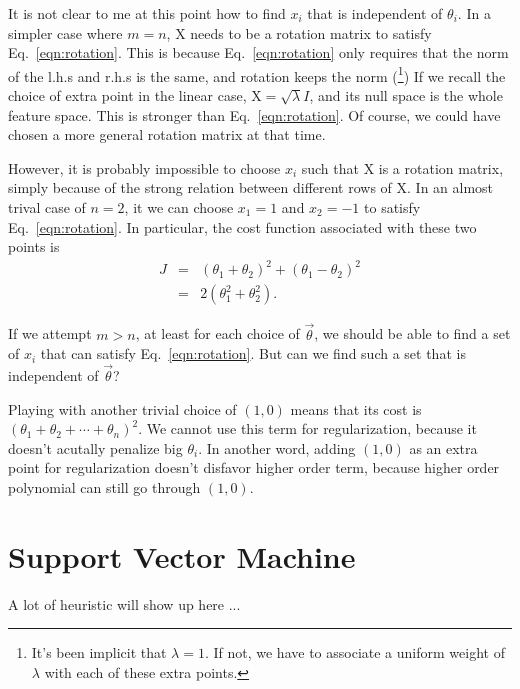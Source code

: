 It is not clear to me at this point how to find $x_i$ that is independent of $\theta_i$. In a simpler case where $m = n$, $\mathrm X$ needs to be a rotation matrix to satisfy Eq.~\ref{eqn:rotation}. This is because Eq.~\ref{eqn:rotation} only requires that the norm of the l.h.s and r.h.s is the same, and rotation keeps the norm (\footnote{It's been implicit that $\lambda=1$. If not, we have to associate a uniform weight of $\lambda$ with each of these extra points.}) If we recall the choice of extra point in the linear case, $\mathrm X=\sqrt{\lambda}I$, and its null space is the whole feature space. This is stronger than Eq.~\ref{eqn:rotation}. Of course, we could have chosen a more general rotation matrix at that time.

However, it is probably impossible to choose $x_i$ such that $\mathrm X$ is a rotation matrix, simply because of the strong relation between different rows of $\mathrm X$. In an almost trival case of $n=2$, it we can choose $x_1=1$ and $x_2=-1$ to satisfy Eq.~\ref{eqn:rotation}. In particular, the cost function associated with these two points is 
\begin{eqnarray}
J& = & \left(\theta_1 + \theta_2 \right)^2 + \left(\theta_1-\theta_2\right)^2\\
 & = & 2(\theta_1^2 + \theta_2^2).
\end{eqnarray}

If we attempt $m>n$, at least for each choice of $\vec\theta$, we should be able to find a set of $x_i$ that can satisfy Eq.~\ref{eqn:rotation}. But can we find such a set that is independent of $\vec\theta$?

Playing with another trivial choice of $(1, 0)$ means that its cost is $(\theta_1 + \theta_2 + \cdots + \theta_n)^2$. We cannot use this term for regularization, because it doesn't acutally penalize big $\theta_i$. In another word, adding $(1, 0)$ as an extra point for regularization doesn't disfavor higher order term, because higher order polynomial can still go through $(1,0)$.

\section{Support Vector Machine}
A lot of heuristic will show up here ...
